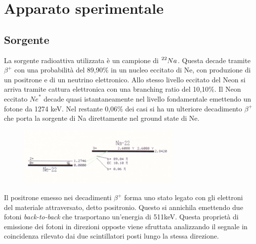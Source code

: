 \documentclass[italian,11pt]{report}
\begin{document}
\chapter{Apparato sperimentale}

\section{Sorgente}
La sorgente radioattiva utilizzata è un campione di $\prescript{22}{}{Na}_{}^{}$. Questa decade tramite $\beta^{+}$ con una probabilità del 89,90$\%$ in un nucleo eccitato di Ne, con produzione di un positrone e di un neutrino elettronico. Allo stesso livello eccitato del Neon si arriva tramite cattura elettronica con una branching ratio del 10,10$\%$. Il Neon eccitato ${Ne}^{*}$ decade quasi istantaneamente nel livello fondamentale emettendo un fotone da 1274 keV. Nel restante 0,06$\%$ dei casi si ha un ulteriore decadimento $\beta^{+}$ che porta la sorgente di Na direttamente nel ground state di Ne. 



\begin{figure}[htp]
\centering
\includegraphics[width=8cm]{decadimentoNa.png}
\end{figure}
Il positrone emesso nei decadimenti $\beta^{+}$ forma uno stato legato con gli elettroni del materiale attraversato, detto positronio. Questo si annichila emettendo due fotoni \textit{back-to-back} che trasportano un'energia di 511keV. Questa proprietà di emissione dei fotoni in direzioni opposte viene sfruttata analizzando il segnale in coincidenza rilevato dai due scintillatori posti lungo la stessa direzione.
\end{document}
